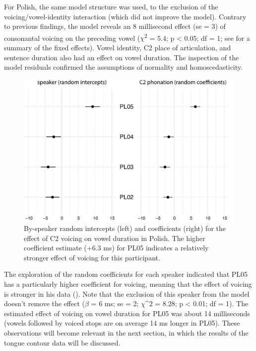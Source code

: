 \documentclass[authoryear, 5p]{elsarticle}
\begin{document}
For Polish, the same model structure was used, to the exclusion of the
voicing/vowel-identity interaction (which did not improve the model).
Contrary to previous findings, the model reveals an 8 millisecond effect
(se = 3) of consonantal voicing on the preceding vowel
(\(\chi\)\textsuperscript{2} = 5.4; p \textless{} 0.05; df = 1; see
 for a summary of the fixed effects). Vowel
identity, C2 place of articulation, and sentence duration also had an
effect on vowel duration. The inspection of the model residuals
confirmed the assumptions of normality and homoscedasticity.

\begin{figure}
    \centering
    \includegraphics[height=.3\textwidth]{fig/polish-re.pdf}
    \caption{By-speaker random intercepts (left) and coefficients (right) for the effect of C2 voicing on vowel duration in Polish. The higher coefficient estimate (+6.3 ms) for PL05 indicates a relatively stronger effect of voicing for this participant.}
    \label{f:polish-re}
\end{figure}

The exploration of the random coefficients for each speaker indicated
that PL05 has a particularly higher coefficient for voicing, meaning
that the effect of voicing is stronger in his data ().
Note that the exclusion of this speaker from the model doesn't remove
the effect (\(\beta\) = 6 ms; se = 2; \(\chi\^2\) = 8.28; p \textless{}
0.01; df = 1). The estimated effect of voicing on vowel duration for
PL05 was about 14 milliseconds (vowels followed by voiced stops are on
average 14 ms longer in PL05). These observations will become relevant
in the next section, in which the results of the tongue contour data
will be discussed.

\end{document}
